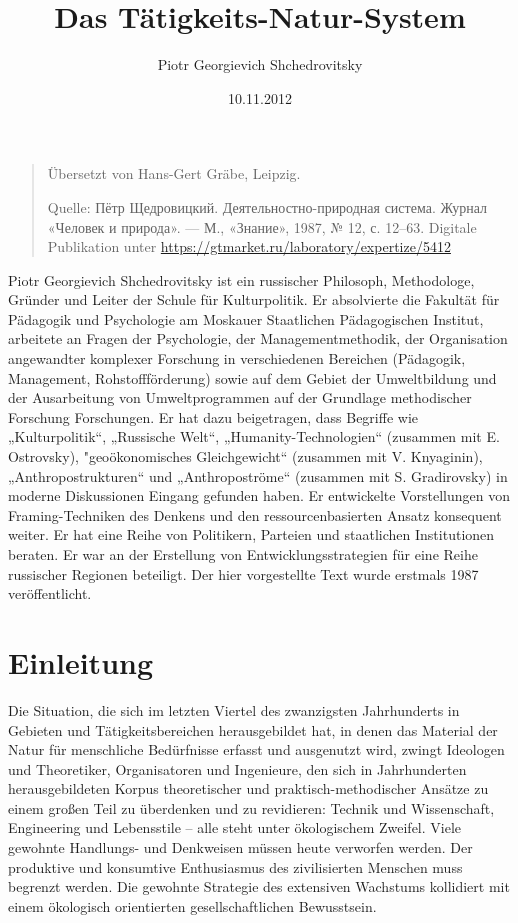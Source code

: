 \documentclass[11pt,a4paper]{article}
\title{Das Tätigkeits-Natur-System}
\author{Piotr Georgievich Shchedrovitsky}
\date{10.11.2012}
\begin{document}
\maketitle
\begin{quote}
  Übersetzt von Hans-Gert Gräbe, Leipzig.
  
  Quelle: \foreignlanguage{russian}{Пётр Щедровицкий. Деятельностно-природная
    система. Журнал «Человек и природа». — М., «Знание», 1987, № 12,
    с. 12–63}.  Digitale Publikation unter
  \url{https://gtmarket.ru/laboratory/expertize/5412}
\end{quote}

\tableofcontents
\clearpage

Piotr Georgievich Shchedrovitsky ist ein russischer Philosoph, Methodologe,
Gründer und Leiter der Schule für Kulturpolitik. Er absolvierte die Fakultät
für Pädagogik und Psychologie am Moskauer Staatlichen Pädagogischen Institut,
arbeitete an Fragen der Psychologie, der Managementmethodik, der Organisation
angewandter komplexer Forschung in verschiedenen Bereichen (Pädagogik,
Management, Rohstoff\-förderung) sowie auf dem Gebiet der Umweltbildung und
der Ausarbeitung von Umweltprogrammen auf der Grundlage methodischer Forschung
Forschungen.  Er hat dazu beigetragen, dass Begriffe wie „Kulturpolitik“,
„Russische Welt“, „Humanity-Technologien“ (zusammen mit E. Ostrovsky),
"geoökonomisches Gleichgewicht“ (zusammen mit V. Knyaginin),
„Anthropostrukturen“ und „Anthropoströme“ (zusammen mit S.  Gradirovsky) in
moderne Diskussionen Eingang gefunden haben. Er entwickelte Vorstellungen von
Framing-Techniken des Denkens und den ressourcenbasierten Ansatz konsequent
weiter. Er hat eine Reihe von Politikern, Parteien und staatlichen
Institutionen beraten.  Er war an der Erstellung von Entwicklungsstrategien
für eine Reihe russischer Regionen beteiligt.  Der hier vorgestellte Text
wurde erstmals 1987 veröffentlicht.

\section{Einleitung}

Die Situation, die sich im letzten Viertel des zwanzigsten Jahrhunderts in
Gebieten und Tätigkeitsbereichen herausgebildet hat, in denen das Material der
Natur für menschliche Bedürfnisse erfasst und ausgenutzt wird, zwingt
Ideologen und Theoretiker, Organisatoren und Ingenieure, den sich in
Jahrhunderten herausgebildeten Korpus theoretischer und praktisch-methodischer
Ansätze zu einem großen Teil zu überdenken und zu revidieren: Technik und
Wissenschaft, Engineering und Lebensstile -- alle steht unter ökologischem
Zweifel. Viele gewohnte Handlungs- und Denkweisen müssen heute verworfen
werden.  Der produktive und konsumtive Enthusiasmus des zivilisierten Menschen
muss begrenzt werden. Die gewohnte Strategie des extensiven Wachstums
kollidiert mit einem ökologisch orientierten gesellschaftlichen Bewusstsein.
\end{document}
